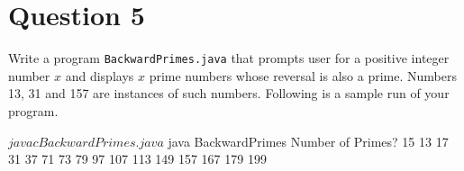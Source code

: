 \documentclass[12pt,letterpaper,twoside]{article}
\begin{document}
\newpage

\section*{Question 5}

Write a program \texttt{BackwardPrimes.java} that prompts user for a positive integer number $x$ and displays $x$ prime numbers whose reversal is also a prime.
Numbers 13, 31 and 157 are instances of such numbers.
Following is a sample run of your program.

\begin{terminal}
$ javac BackwardPrimes.java
$ java BackwardPrimes
Number of Primes? 15
13 17 31 37 71 73 79 97 107 113 149 157 167 179 199
\end{terminal}

\end{document}
